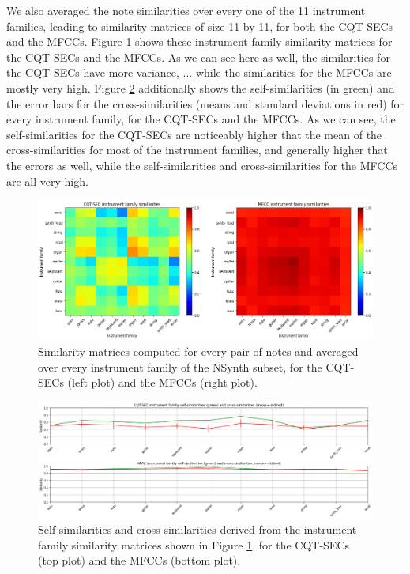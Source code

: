 \documentclass[journal]{IEEEtran}
\begin{document}
We also averaged the note similarities over every one of the 11 instrument families, leading to similarity matrices of size 11 by 11, for both the CQT-SECs and the MFCCs. Figure \ref{fig:family_similarities} shows these instrument family similarity matrices for the CQT-SECs and the MFCCs. As we can see here as well, the similarities for the CQT-SECs have more variance, ... while the similarities for the MFCCs are mostly very high. Figure \ref{fig:family_similarities2} additionally shows the self-similarities (in green) and the error bars for the cross-similarities (means and standard deviations in red) for every instrument family, for the CQT-SECs and the MFCCs. As we can see, the self-similarities for the CQT-SECs are noticeably higher that the mean of the cross-similarities for most of the instrument families, and generally higher that the errors as well, while the self-similarities and cross-similarities for the MFCCs are all very high.

\begin{figure}[htp]
    \centering
    \includegraphics[width=\textwidth]{family_similarities.png}
    \caption{Similarity matrices computed for every pair of notes and averaged over every instrument family of the NSynth subset, for the CQT-SECs (left plot) and the MFCCs (right plot).}
    \label{fig:family_similarities}
\end{figure}

\begin{figure}[htp]
    \centering
    \includegraphics[width=\textwidth]{family_similarities2.png}
    \caption{Self-similarities and cross-similarities derived from the instrument family similarity matrices shown in Figure \ref{fig:family_similarities}, for the CQT-SECs (top plot) and the MFCCs (bottom plot).}
    \label{fig:family_similarities2}
\end{figure}
\end{document}
